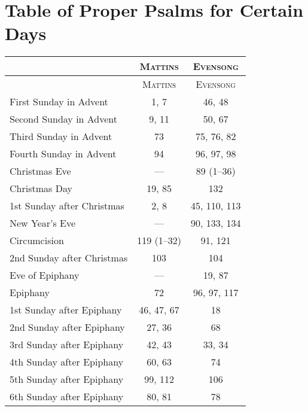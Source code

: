 \section[Proper Psalms for Certain Days]{Table of Proper Psalms for Certain Days}
{\scriptsize

\begin{longtabu} to 
\hline 
    & {\scshape Mattins} & {\scshape Evensong}\\
\hline
\endfirsthead
\hline
    & {\scshape Mattins} & {\scshape Evensong}\\
\hline
\endhead

First Sunday in Advent\dotfill      & 1, 7          & 46, 48\\
Second Sunday in Advent\dotfill     & 9, 11         & 50, 67\\
Third Sunday in Advent\dotfill      & 73            & 75, 76, 82 \\
Fourth Sunday in Advent\dotfill     & 94            & 96, 97, 98 \\
Christmas Eve\dotfill               & —             & 89 (1–36) \\
Christmas Day\dotfill               & 19, 85        & 132 \\
1st Sunday after Christmas\dotfill  & 2, 8          & 45, 110, 113\\
New Year’s Eve \dotfill             & —                 & 90, 133, 134\\
Circumcision\dotfill                & 119 (1–32)        & 91, 121 \\
2nd Sunday after Christmas\dotfill  & 103            & 104 \\
Eve of Epiphany\dotfill             & —                 & 19, 87 \\
Epiphany\dotfill                    & 72            & 96, 97, 117 \\
1st Sunday after Epiphany\dotfill   & 46, 47, 67        & 18 \\
2nd Sunday after Epiphany\dotfill   & 27, 36        & 68 \\
3rd Sunday after Epiphany\dotfill   & 42, 43            & 33, 34 \\
4th Sunday after Epiphany\dotfill   & 60, 63            & 74 \\
5th Sunday after Epiphany\dotfill   & 99, 112           & 106 \\
6th Sunday after Epiphany\dotfill   & 80, 81            & 78 \\

\end{longtabu}}
